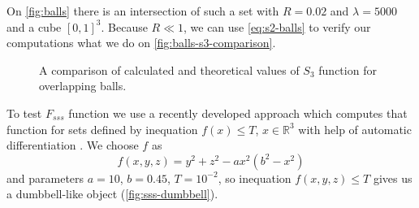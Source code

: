 \documentclass[1p]{elsarticle}
\begin{document}
On \cref{fig:balls} there is an intersection of such a set with $R = 0.02$ and
$\lambda=5000$ and a cube $[0, 1]^3$. Because $R \ll 1$, we can use
\cref{eq:s2-balls} to verify our computations what we do on
\cref{fig:balls-s3-comparison}.
\begin{figure}[tp]
  \centering
  \hfill
  \caption[]{A comparison of calculated and theoretical values of $S_3$ function
    for overlapping balls.}
  \label{fig:s3-verification}
\end{figure}

To test $F_{sss}$ function we use a recently developed approach which computes
that function for sets defined by inequation $f(x) \le T$, $x \in \mathbb{R}^3$
with help of automatic differentiation \cite{postnicov20232}. We choose $f$ as
\begin{equation}
  f(x, y, z) = y^2 + z^2 - a x^2 (b^2 - x^2)
\end{equation}
and parameters $a = 10$, $b = 0.45$, $T = 10^{-2}$, so inequation
$f(x, y, z) \le T$ gives us a dumbbell-like object (\cref{fig:sss-dumbbell}).
\end{document}
